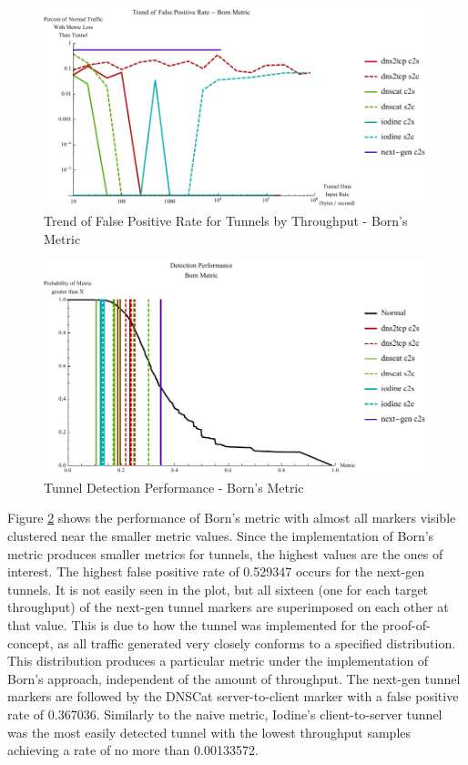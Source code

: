 \documentclass[12pt]{report}
\theoremstyle{remark}
\theoremstyle{definition}
\theoremstyle{definition}
\theoremstyle{definition}
\begin{document}
\begin{figure}
\centering
\includegraphics[width=\textwidth]{figures/cbplot.pdf}
\caption[Trend of False Positive Rate for Tunnels by Throughput - Born's 
Metric]{Trend of False Positive Rate for Tunnels by Throughput - Born's Metric}
\label{cbplot}
\end{figure}

\begin{figure}
\centering
\includegraphics[width=\textwidth]{figures/mpbv.pdf}
\caption[Tunnel Detection Performance - Born's Metric]{Tunnel Detection 
Performance - Born's Metric}
\label{mpbv}
\end{figure}

Figure \ref{mpbv} shows the performance of Born's metric with almost all markers
visible clustered near the smaller metric values. Since the implementation of
Born's metric produces smaller metrics for tunnels, the highest values are the
ones of interest. The highest false positive rate of 0.529347 occurs for the
next-gen tunnels. It is not easily seen in the plot, but all sixteen (one for
each target throughput) of the next-gen tunnel markers are superimposed on each
other at that value. This is due to how the tunnel was implemented for the
proof-of-concept, as all traffic generated very closely conforms to a specified
distribution. This distribution produces a particular metric under the
implementation of Born's approach, independent of the amount of throughput. The
next-gen tunnel markers are followed by the DNSCat server-to-client marker with
a false positive rate of 0.367036. Similarly to the naive metric, Iodine's
client-to-server tunnel was the most easily detected tunnel with the lowest
throughput samples achieving a rate of no more than 0.00133572.
\end{document}
